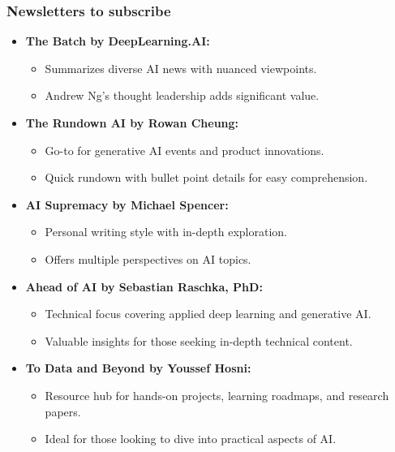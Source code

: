 \begin{frame}\frametitle{Newsletters to subscribe}

\begin{itemize}
  \item \textbf{The Batch by DeepLearning.AI:}
    \begin{itemize}
      \item Summarizes diverse AI news with nuanced viewpoints.
      \item Andrew Ng's thought leadership adds significant value.
    \end{itemize}

  \item \textbf{The Rundown AI by Rowan Cheung:}
    \begin{itemize}
      \item Go-to for generative AI events and product innovations.
      \item Quick rundown with bullet point details for easy comprehension.
    \end{itemize}

  \item \textbf{AI Supremacy by Michael Spencer:}
    \begin{itemize}
      \item Personal writing style with in-depth exploration.
      \item Offers multiple perspectives on AI topics.
    \end{itemize}

  \item \textbf{Ahead of AI by Sebastian Raschka, PhD:}
    \begin{itemize}
      \item Technical focus covering applied deep learning and generative AI.
      \item Valuable insights for those seeking in-depth technical content.
    \end{itemize}

  \item \textbf{To Data and Beyond by Youssef Hosni:}
    \begin{itemize}
      \item Resource hub for hands-on projects, learning roadmaps, and research papers.
      \item Ideal for those looking to dive into practical aspects of AI.
    \end{itemize}
\end{itemize}


\end{frame}
